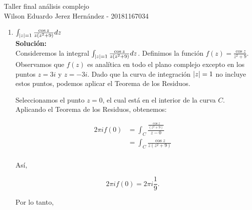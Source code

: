 


	\noindent Taller final análisis complejo \\
	Wilson Eduardo Jerez Hernández - 20181167034
	\begin{enumerate}
		\item $\int_{\lvert z\rvert=1} \frac{\cos{z}}{z(z^{2}+9)}dz$
		\\ \textbf{Solución:} \\
		Consideremos la integral $\int_{\lvert z\rvert=1} \frac{\cos{z}}{z(z^{2}+9)}dz$.
		Definimos la función $f(z)=\frac{\cos{z}}{z^{2}+9}$. Observamos que $f(z)$ es analítica en todo el plano complejo excepto en los puntos $z=3i$ y $z=-3i$. Dado que la curva de integración $\lvert z\rvert=1$ no incluye estos puntos, podemos aplicar el Teorema de los Residuos.
		
		Seleccionamos el punto $z=0$, el cual está en el interior de la curva $C$. Aplicando el Teorema de los Residuos, obtenemos:
		
		\begin{align*}
			2\pi i f(0)&=\int_{C}\frac{\frac{\cos{z}}{(z^{2}+9)}}{z-0}\\
			&= \int_{C}\frac{\cos{z}}{z(z^{2}+9)} \\
		\end{align*}
		
		Así, 
		
		$$2\pi i f(0)= 2\pi i \frac{1}{9}. $$
		
		Por lo tanto, 
		

\end{enumerate}

